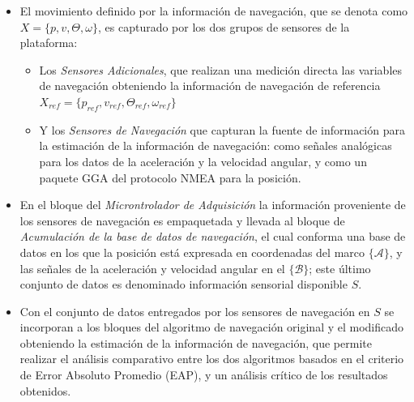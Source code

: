 \documentclass[10pt]{report}
\numberwithin{equation}{chapter}
\numberwithin{algorithm}{chapter}
\newcommand{\marco}[1]{\{\mathcal{#1}\}}
\begin{document}
\begin{itemize}
\item El movimiento definido por la información de navegación, que se denota como $X=\{p,v,\Theta,\omega\}$, es capturado por los dos grupos de sensores de la plataforma: 
	\begin{itemize}
		\item Los \emph{Sensores Adicionales}, que realizan una medición directa las variables de navegación obteniendo la información de navegación de referencia $X_{ref}=\{p_{ref},v_{ref},\Theta_{ref},\omega_{ref}\}$ 
		\item Y los \emph{Sensores de Navegación} que capturan la fuente de información para la estimación de la información de navegación: como señales analógicas para los datos de la aceleración y la velocidad angular, y como un paquete GGA del protocolo NMEA para la posición.
	\end{itemize}
\item En el bloque del \emph{Microntrolador de Adquisición} la información proveniente de los sensores de navegación es empaquetada y llevada al bloque de \emph{Acumulación de la base de datos de navegación}, el cual conforma una base de datos en los que la posición está expresada en coordenadas del marco $\marco{A}$, y las señales de la aceleración y velocidad angular en el $\marco{B}$; este último conjunto de datos es denominado información sensorial disponible $S$.
\item Con el conjunto de datos entregados por los sensores de navegación en $S$ se incorporan a los bloques del algoritmo de navegación original y el modificado obteniendo la estimación de la información de navegación, que permite realizar el análisis comparativo entre los dos algoritmos basados en el criterio de Error Absoluto Promedio (EAP), y  un análisis crítico de los resultados obtenidos.
\end{itemize}
\end{document}
